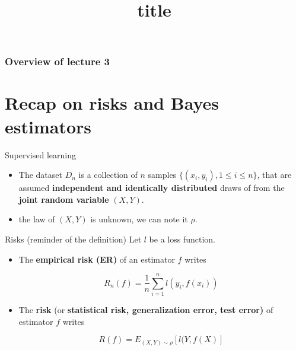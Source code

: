 \documentclass[usenames,dvipsnames]{beamer}
\title[FTML]{title}
\date{} %
\begin{document}
\begin{frame}
\titlepage %
\end{frame}

\begin{frame}
\frametitle{Overview of lecture 3} %
\tableofcontents %
\end{frame}

\section{Recap on risks and Bayes estimators}

\begin{frame}{Supervised learning}
    \begin{itemize}
	\item The dataset $D_n$ is a collection of $n$ samples $\{(x_i, y_i), 1\leq i\leq n\}$, that are assumed \textbf{{independent and identically distributed}} draws of from the \textbf{joint random variable} $(X, Y)$.
        \item the law of $(X,Y)$ is unknown, we can note it $\rho$.
    \end{itemize}
\end{frame}



\begin{frame}{Risks (reminder of the definition)}
    Let $l$ be a loss function.

    \begin{itemize}
        \item The \textbf{{empirical risk (ER)}} of an estimator $f$ writes

    \begin{equation}
	R_n(f) = \frac{1}{n} \sum^{n}_{i=1} l(y_i, f(x_i))
    \end{equation}
    \item The \textbf{{risk}} (or \textbf{{statistical risk, generalization error, test error)}} of estimator $f$ writes

    \begin{equation}
	R(f)=E_{(X,Y)\sim \rho}[l(Y,f(X)]
    \end{equation}
    \end{itemize}


\end{frame}
\end{document}
